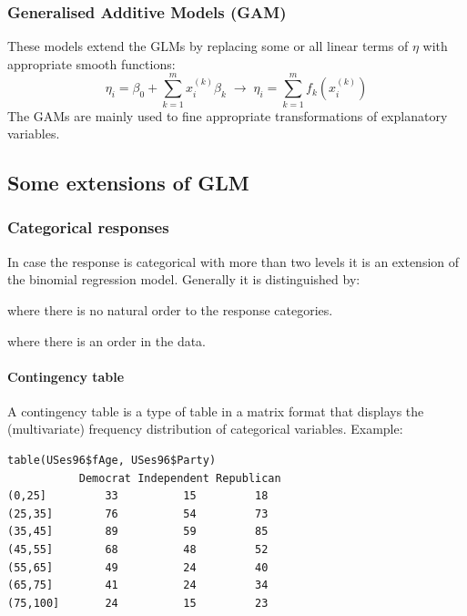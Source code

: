 \subsubsection{Generalised Additive Models (GAM)}
These models extend the GLMs by replacing some or all linear terms of $\eta$ with appropriate smooth functions:
\begin{equation*}
\eta_i = \beta_0+\sum_{k=1}^{m}x_i^{(k)}\beta_k \; \rightarrow \; \eta_i = \sum_{k=1}^{m}f_k\left(x_i^{(k)}\right)
\end{equation*}
The GAMs are mainly used to fine appropriate transformations of explanatory variables.

\subsection{Some extensions of GLM}

\subsubsection{Categorical responses}
In case the response is categorical with more than two levels it is an extension of the binomial regression model. Generally it is distinguished by:
\begin{description}
	\tightlist
	\item[Nominal data] where there is no natural order to the response	categories.
	\item[Ordinal data] where there is an order in the data.
\end{description}

\paragraph{Contingency table}
A contingency table is a type of table in a matrix format that displays the (multivariate) frequency distribution of categorical variables. Example:
\begin{lstlisting}
table(USes96$fAge, USes96$Party)
           Democrat Independent Republican
(0,25]         33          15         18
(25,35]        76          54         73
(35,45]        89          59         85
(45,55]        68          48         52
(55,65]        49          24         40
(65,75]        41          24         34
(75,100]       24          15         23
\end{lstlisting}

